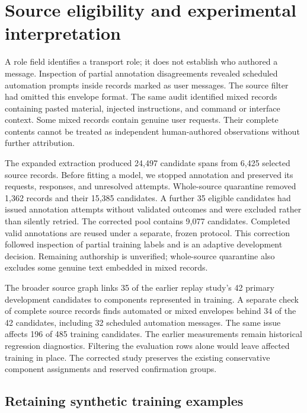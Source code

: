 \section{Source eligibility and experimental interpretation}

A role field identifies a transport role; it does not establish who authored a
message. Inspection of partial annotation disagreements revealed scheduled
automation prompts inside records marked as user messages. The source filter
had omitted this envelope format. The same audit identified mixed records
containing pasted material, injected instructions, and command or interface
context. Some mixed records contain genuine user requests. Their complete
contents cannot be treated as independent human-authored observations without
further attribution.

The expanded extraction produced 24,497 candidate spans from 6,425 selected
source records. Before fitting a model, we stopped annotation and preserved its
requests, responses, and unresolved attempts. Whole-source quarantine removed
1,362 records and their 15,385 candidates. A further 35 eligible candidates had
issued annotation attempts without validated outcomes and were excluded rather
than silently retried. The corrected pool contains 9,077 candidates. Completed
valid annotations are reused under a separate, frozen protocol. This correction
followed inspection of partial training labels and is an adaptive development
decision. Remaining authorship is unverified; whole-source quarantine also
excludes some genuine text embedded in mixed records.

The broader source graph links 35 of the earlier replay study's 42 primary
development candidates to components represented in training. A separate check
of complete source records finds automated or mixed envelopes behind 34 of the
42 candidates, including 32 scheduled automation messages. The same issue
affects 196 of 485 training candidates. The earlier measurements remain
historical regression diagnostics. Filtering the evaluation rows alone would
leave affected training in place. The corrected study preserves the existing
conservative component assignments and reserved confirmation groups.



\subsection{Retaining synthetic training examples}

